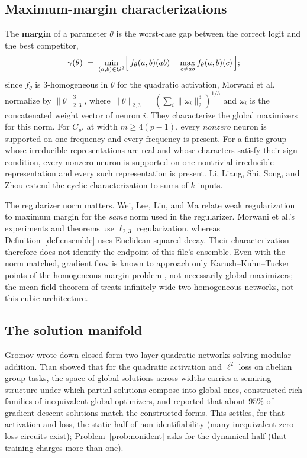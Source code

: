 \documentclass[11pt]{amsart}
\theoremstyle{plain}
\theoremstyle{definition}
\begin{document}
\subsection*{Maximum-margin characterizations}
The \textbf{margin} of a parameter $\theta$ is the worst-case gap between the correct logit and the best competitor,
\[
   \gamma(\theta) \;=\; \min_{(a,b) \in G^2} \Bigl[\, f_\theta(a,b)(ab) - \max_{c \neq ab} f_\theta(a,b)(c) \,\Bigr];
\]
since $f_\theta$ is $3$-homogeneous in $\theta$ for the quadratic activation, Morwani et al.~\cite{morwani2024} normalize by $\|\theta\|_{2,3}^3$, where $\|\theta\|_{2,3}=(\sum_i\|\omega_i\|_2^3)^{1/3}$ and $\omega_i$ is the concatenated weight vector of neuron $i$. They characterize the global maximizers for this norm. For $C_p$, at width $m\ge4(p-1)$, every \emph{nonzero} neuron is supported on one frequency and every frequency is present. For a finite group whose irreducible representations are real and whose characters satisfy their sign condition, every nonzero neuron is supported on one nontrivial irreducible representation and every such representation is present. Li, Liang, Shi, Song, and Zhou \cite{li2025} extend the cyclic characterization to sums of $k$ inputs.

The regularizer norm matters. Wei, Lee, Liu, and Ma \cite{wei2019} relate weak regularization to maximum margin for the \emph{same} norm used in the regularizer. Morwani et al.'s experiments and theorems use $\ell_{2,3}$ regularization, whereas Definition~\ref{def:ensemble} uses Euclidean squared decay. Their characterization therefore does not identify the endpoint of this file's ensemble. Even with the norm matched, gradient flow is known to approach only Karush--Kuhn--Tucker points of the homogeneous margin problem \cite{lyu2020}, not necessarily global maximizers; the mean-field theorem of \cite{chizat2020} treats infinitely wide two-homogeneous networks, not this cubic architecture.

\subsection*{The solution manifold}
Gromov \cite{gromov2023} wrote down closed-form two-layer quadratic networks solving modular addition. Tian \cite{tian2024} showed that for the quadratic activation and $\ell^2$ loss on abelian group tasks, the space of global solutions across widths carries a semiring structure under which partial solutions compose into global ones, constructed rich families of inequivalent global optimizers, and reported that about $95\%$ of gradient-descent solutions match the constructed forms. This settles, for that activation and loss, the static half of non-identifiability (many inequivalent zero-loss circuits exist); Problem~\ref{prob:nonident} asks for the dynamical half (that training charges more than one).
\end{document}
